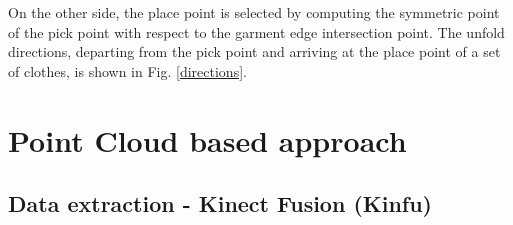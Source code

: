 On the other side, the place point is selected by computing the symmetric point of the pick point with respect to the garment edge intersection point. The unfold directions, departing from the pick point and arriving at the place point of a set of clothes, is shown in Fig. \ref{directions}.

\section{Point Cloud based approach}

\subsection{Data extraction - Kinect Fusion (Kinfu)}

\subsection{}